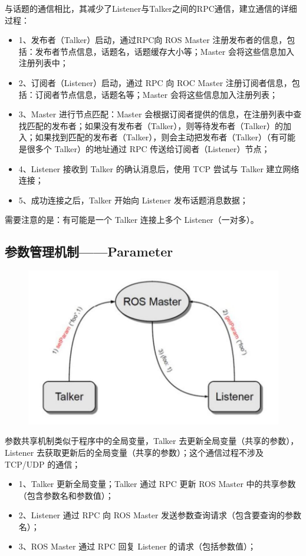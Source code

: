 \documentclass[10pt, oneside]{book}
\begin{document}
与话题的通信相比，其减少了Listener与Talker之间的RPC通信，建立通信的详细过程：

\begin{itemize}
    \item 1、发布者（Talker）启动，通过RPC向 ROS Master 注册发布者的信息，包括：发布者节点信息，话题名，话题缓存大小等；Master 会将这些信息加入注册列表中；
    \item 2、订阅者（Listener）启动，通过 RPC 向 ROC Master 注册订阅者信息，包括：订阅者节点信息，话题名等；Master 会将这些信息加入注册列表；
    \item 3、Master 进行节点匹配：Master 会根据订阅者提供的信息，在注册列表中查找匹配的发布者；如果没有发布者（Talker），则等待发布者（Talker）的加入；如果找到匹配的发布者（Talker），则会主动把发布者（Talker）（有可能是很多个 Talker）的地址通过 RPC 传送给订阅者（Listener）节点；
    \item 4、Listener 接收到 Talker 的确认消息后，使用 TCP 尝试与 Talker 建立网络连接；
    \item 5、成功连接之后，Talker 开始向 Listener 发布话题消息数据；
\end{itemize}

需要注意的是：有可能是一个 Talker 连接上多个 Listener（一对多）。

\subsection{参数管理机制——Parameter}

\begin{figure}[H]
    \centering
    \includegraphics[width=0.7\linewidth]{image/参数管理机制.jpg}
\end{figure}

参数共享机制类似于程序中的全局变量，Talker 去更新全局变量（共享的参数），Listener 去获取更新后的全局变量（共享的参数）；这个通信过程不涉及 TCP/UDP 的通信；     

\begin{itemize}
    \item 1、Talker 更新全局变量；Talker 通过 RPC 更新 ROS Master 中的共享参数（包含参数名和参数值）；
    \item 2、Listener 通过 RPC 向 ROS Master 发送参数查询请求（包含要查询的参数名）；
    \item 3、ROS Master 通过 RPC 回复 Listener 的请求（包括参数值）；
\end{itemize}
\end{document}
